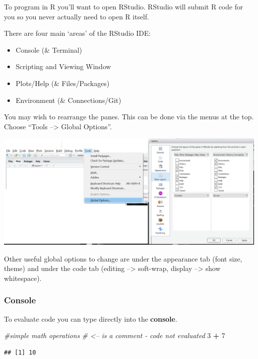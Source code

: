 \documentclass[
]{book}
\newenvironment{Shaded}{\begin{snugshade}}{\end{snugshade}}
\newcommand{\CommentTok}[1]{\textcolor[rgb]{0.56,0.35,0.01}{\textit{#1}}}
\newcommand{\DecValTok}[1]{\textcolor[rgb]{0.00,0.00,0.81}{#1}}
\newcommand{\OperatorTok}[1]{\textcolor[rgb]{0.81,0.36,0.00}{\textbf{#1}}}
\newcommand{\StringTok}[1]{\textcolor[rgb]{0.31,0.60,0.02}{#1}}
\theoremstyle{definition}
\theoremstyle{definition}
\theoremstyle{definition}
\theoremstyle{remark}
\begin{document}
To program in R you'll want to open RStudio. RStudio will submit R code for you so you never actually need to open R itself.

There are four main `areas' of the RStudio IDE:

\begin{itemize}
\item
  Console (\& Terminal)
\item
  Scripting and Viewing Window
\item
  Plots/Help (\& Files/Packages)
\item
  Environment (\& Connections/Git)
\end{itemize}

You may wish to rearrange the panes. This can be done via the menus at the top. Choose ``Tools --\textgreater{} Global Options''.

\includegraphics[width=0.8\linewidth]{img/panes}

Other useful global options to change are under the appearance tab (font size, theme) and under the code tab (editing --\textgreater{} soft-wrap, display --\textgreater{} show whitespace).

\hypertarget{console-1}{%
\subsubsection{Console}\label{console-1}}

To evaluate code you can type directly into the \textbf{console}.

\begin{Shaded}
\begin{Highlighting}[]
\CommentTok{#simple math operations}
\CommentTok{# <-- is a comment - code not evaluated}
\DecValTok{3} \OperatorTok{+}\StringTok{ }\DecValTok{7}
\end{Highlighting}
\end{Shaded}

\begin{verbatim}
## [1] 10
\end{verbatim}
\end{document}

